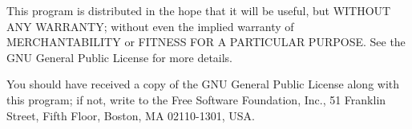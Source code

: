 This program is distributed in the hope that it will be useful,
but WITHOUT ANY WARRANTY; without even the implied warranty of
MERCHANTABILITY or FITNESS FOR A PARTICULAR PURPOSE.  See the
GNU General Public License for more details.

You should have received a copy of the GNU General Public License
along with this program; if not, write to the Free Software
Foundation, Inc., 51 Franklin Street, Fifth Floor, Boston, MA  02110-1301, USA.


 
